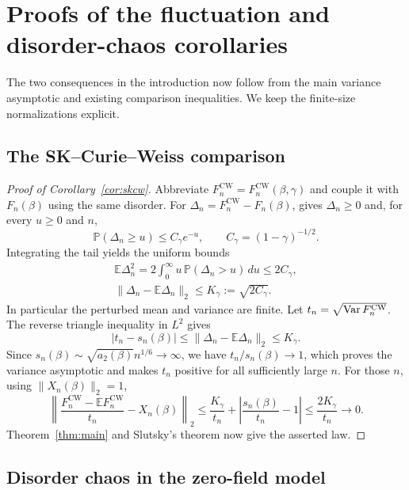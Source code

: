 \section{Proofs of the fluctuation and disorder-chaos corollaries}
\label{sec:consequences}

The two consequences in the introduction now follow from the main
variance asymptotic and existing comparison inequalities. We keep the
finite-size normalizations explicit.

\subsection{The SK--Curie--Weiss comparison}

\begin{proof}[Proof of Corollary~\ref{cor:skcw}]
Abbreviate $F_n^{\mathrm{CW}}=F_n^{\mathrm{CW}}(\beta,\gamma)$ and
couple it with $F_n(\beta)$ using the same disorder. For
$\Delta_n=F_n^{\mathrm{CW}}-F_n(\beta)$, \cite[Proposition~1.5]{DeyKang2026} gives
$\Delta_n\ge0$ and, for every $u\ge0$ and $n$,
\[
 \mathbb P(\Delta_n\ge u)\le C_\gamma e^{-u},
 \qquad C_\gamma=(1-\gamma)^{-1/2}.
\]
Integrating the tail yields the uniform bounds
\[
 \begin{gathered}
 \mathbb E\Delta_n^2
 =2\int_0^\infty u\,\mathbb P(\Delta_n>u)\,du
 \le2C_\gamma,\\
 \|\Delta_n-\mathbb E\Delta_n\|_2
 \le K_\gamma:=\sqrt{2C_\gamma}.
 \end{gathered}
\]
In particular the perturbed mean and variance are finite. Let
$t_n=\sqrt{\operatorname{Var} F_n^{\mathrm{CW}}}$. The reverse triangle inequality
in $L^2$ gives
\[
 |t_n-s_n(\beta)|
 \le\|\Delta_n-\mathbb E\Delta_n\|_2\le K_\gamma.
\]
Since $s_n(\beta)\sim\sqrt{a_2(\beta)}n^{1/6}\to\infty$, we have
$t_n/s_n(\beta)\to1$, which proves the variance asymptotic and makes
$t_n$ positive for all sufficiently large $n$. For those $n$, using
$\|X_n(\beta)\|_2=1$,
\[
 \left\|\frac{F_n^{\mathrm{CW}}-\mathbb E F_n^{\mathrm{CW}}}{t_n}
             -X_n(\beta)\right\|_2
 \le\frac{K_\gamma}{t_n}
   +\left|\frac{s_n(\beta)}{t_n}-1\right|
 \le\frac{2K_\gamma}{t_n}\longrightarrow0.
\]
Theorem~\ref{thm:main} and Slutsky's theorem now give the asserted law.
\end{proof}

\subsection{Disorder chaos in the zero-field model}

